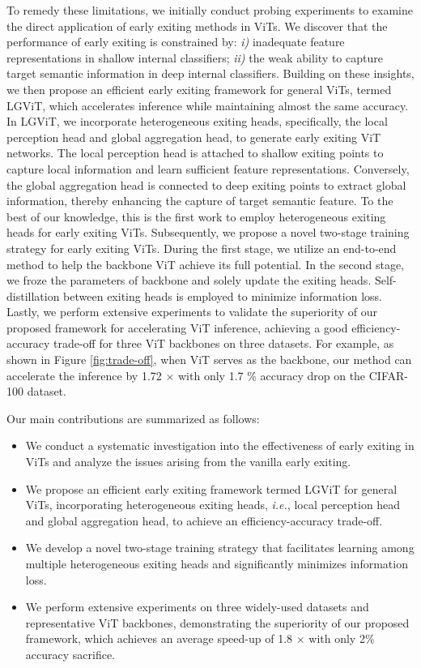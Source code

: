 To remedy these limitations, we initially conduct probing experiments to examine the direct application of early exiting methods in ViTs. 
We discover that the performance of early exiting is constrained by: 
\textit{i)} inadequate feature representations in shallow internal classifiers; 
\textit{ii)} the weak ability to capture target semantic information in deep internal classifiers. 
Building on these insights, we then propose an efficient early exiting framework for general ViTs, termed LGViT, which accelerates inference while maintaining almost the same accuracy.
In LGViT, we incorporate heterogeneous exiting heads, specifically, the local perception head and global aggregation head, 
to generate early exiting ViT networks. 
The local perception head is attached to shallow exiting points to capture local information and learn sufficient feature representations. 
Conversely, the global aggregation head is connected to deep exiting points to extract global information, thereby enhancing the capture of target semantic feature. 
To the best of our knowledge, this is the first work to employ heterogeneous exiting heads for early exiting ViTs. 
Subsequently, we propose a novel two-stage training strategy for early exiting ViTs. 
During the first stage, we utilize an end-to-end method to help the backbone ViT achieve its full potential. 
In the second stage, we froze the parameters of backbone and solely update the exiting heads. 
Self-distillation between exiting heads is employed to minimize information loss. 
Lastly, we perform extensive experiments to validate the superiority of our proposed framework for accelerating ViT inference, 
achieving a good efficiency-accuracy trade-off for three ViT backbones on three datasets. 
For example, as shown in Figure \ref{fig:trade-off}, when ViT serves as the backbone, our method can accelerate the inference by 1.72 $\times$ with only 1.7 \% accuracy drop on the CIFAR-100 dataset. 

Our main contributions are summarized as follows:
\begin{itemize}
    \item We conduct a systematic investigation into the effectiveness of early exiting in ViTs and analyze the issues arising from the vanilla early exiting.
    \item We propose an efficient early exiting framework termed LGViT for general ViTs, incorporating heterogeneous exiting heads, \textit{i.e.}, 
    local perception head and global aggregation head, to achieve an efficiency-accuracy trade-off. 
    \item We develop a novel two-stage training strategy that facilitates learning among multiple heterogeneous exiting heads and significantly minimizes information loss.
    \item We perform extensive experiments on three widely-used datasets and representative ViT backbones, demonstrating the superiority of our proposed framework, 
    which achieves an average speed-up of 1.8 $\times$ with only 2\% accuracy sacrifice. 
\end{itemize}